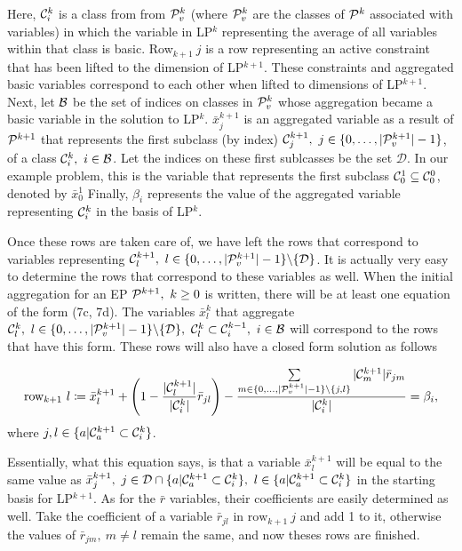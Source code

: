 \documentclass[11pt]{article} %
\newcommand{\cP}{{\cal P}}
\newcommand{\cC}{{\cal C}}
\newcommand{\cB}{{\cal B}}
\begin{document}
	Here, $\cC_i^{k}$ is a class from from $\cP^k_v$ (where $\cP^k_v$ are the classes of $\cP^k$ associated with variables)  in which the variable in LP$^k$ representing the average of all variables within that class is basic.  Row$_{k + 1} \ j$ is a row representing an active constraint that has been lifted to the dimension of LP$^{k + 1}$.  These constraints and aggregated basic variables correspond to each other when lifted to dimensions of LP$^{k + 1}$.  Next, let $\cB$ be the set of indices on classes in $\cP^k_v$ whose aggregation became a basic variable in the solution to LP$^k$.  $\bar{x}_j^{k + 1}$ is an aggregated variable as a result of $\cP^{k + 1}$ that represents the first subclass (by index) $\cC_j^{k + 1}, \ j  \in \{0, \dots, |\cP^{k + 1}_v| - 1\}$, of a class $\cC_i^k , \ i \in \cB$.  Let the indices on these first sublcasses be the set $\mathcal{D}$.  In our example problem, this is the variable that represents the first subclass $\cC_0^1 \subseteq \cC_0^0$, denoted by $\bar{x}_0^1$  Finally, $\beta_i$ represents the value of the aggregated variable representing $\cC_i^k$ in the basis of LP$^k$.
	
	Once these rows are taken care of, we have left the rows that correspond to variables representing $\cC_l^{k + 1},\ l \in  \{0, \dots, |\cP^{k + 1}_v| - 1\} \backslash \{\mathcal{D}\}$.  It is actually very easy to determine the rows that correspond to these variables as well.  When the initial aggregation for an EP $\cP^{k + 1}, \ k \geq 0$ is written, there will be at least one equation of the form (7c, 7d).  The variables $\bar{x}_l^k$ that aggregate $ \cC_l^k, \  l \in  \{0, \dots, |\cP^{k + 1}_v| - 1\} \backslash \{\mathcal{D}\}, \ \cC_l^k \subset \cC_i^{k - 1}, \ i \in \cB$ will correspond to the rows that have this form.  These rows will also have a closed form solution as follows
	
	\begin{equation}
	 \text{row}_{k + 1} \ l \coloneqq \bar{x}_l^{k + 1} + \left(1 - \frac{|\cC^{k + 1}_l|}{|\cC_i^{k}|}\bar{r}_{jl}\right) - \frac{\sum\limits_{m \in \{0, \dots, |\cP^{k + 1}_v| - 1\} \backslash \{j, l\}}|\cC^{k + 1}_m|\bar{r}_{jm}}{|\cC_i^{k}|} = \beta_i, 
	\end{equation}
	where $j,l \in \{a|\cC_a^{k + 1} \subset \cC_i^{k} \}$.
	
	Essentially, what this equation says, is that a variable $\bar{x}_l^{k + 1}$ will be equal to the same value as $\bar{x}_j^{k + 1}, \ j \in \mathcal{D} \cap \{a| \cC_a^{k + 1} \subset \cC_i^k\}, \ l \in \{a| \cC_a^{k + 1} \subset \cC_i^k\} $ in the starting basis for LP$^{k + 1}$.  As for the $\bar{r}$ variables, their coefficients are easily determined as well.  Take the coefficient of a variable $\bar{r}_{jl}$ in $\text{row}_{k + 1} \ j$ and add 1 to it, otherwise the values of $\bar{r}_{jm}, \ m \neq l$ remain the same, and now theses rows are finished. 
	
\end{document}

